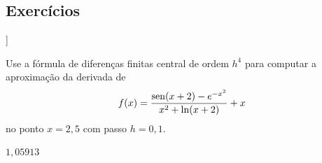 \subsection*{Exercícios}

\begin{flushleft}
  [[tag:revisar]]
\end{flushleft}

\begin{exer}\label{exer:dfch4_fun}
  Use a fórmula de diferenças finitas central de ordem $h^4$ para computar a aproximação da derivada de
  \begin{equation}
    f(x) = \frac{\operatorname{sen}(x+2) - e^{-x^2}}{x^2 + \ln(x+2)}+x
  \end{equation}
no ponto $x=2,5$ com passo $h=0,1$.
\end{exer}
\begin{resp}
  $1,05913$
\end{resp}


